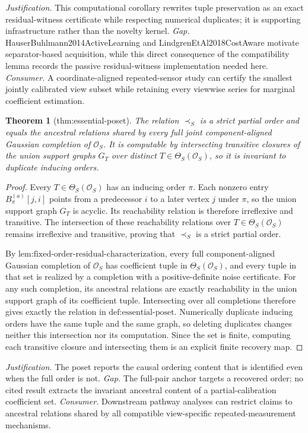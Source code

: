 \documentclass{article}
\newtheorem{theorem}{Theorem}
\begin{document}
\par\smallskip\noindent \textit{Justification.} This computational corollary rewrites tuple preservation as an exact residual-witness certificate while respecting numerical duplicates; it is supporting infrastructure rather than the novelty kernel. \textit{Gap.} HauserBuhlmann2014ActiveLearning and LindgrenEtAl2018CostAware motivate separator-based acquisition, while this direct consequence of the compatibility lemma records the passive residual-witness implementation needed here. \textit{Consumer.} A coordinate-aligned repeated-sensor study can certify the smallest jointly calibrated view subset while retaining every viewwise series for marginal coefficient estimation.

\begin{theorem}[thm:essential-poset]\label{thm:essential-poset}
The relation \(\prec_S\) is a strict partial order and equals the ancestral relations shared by every full joint component-aligned Gaussian completion of \(\mathcal O_S\). It is computable by intersecting transitive closures of the union support graphs \(G_T\) over distinct \(T\in\Theta_S(\mathcal O_S)\), so it is invariant to duplicate inducing orders.
\end{theorem}
\begin{proof}
Every \(T\in\Theta_S(\mathcal O_S)\) has an inducing order \(\pi\).  Each nonzero entry \(B_\pi^{(a)}[j,i]\) points from a predecessor \(i\) to a later vertex \(j\) under \(\pi\), so the union support graph \(G_T\) is acyclic.  Its reachability relation is therefore irreflexive and transitive.  The intersection of these reachability relations over \(T\in\Theta_S(\mathcal O_S)\) remains irreflexive and transitive, proving that \(\prec_S\) is a strict partial order.

By \(\text{lem:fixed-order-residual-characterization}\), every full component-aligned Gaussian completion of \(\mathcal O_S\) has coefficient tuple in \(\Theta_S(\mathcal O_S)\), and every tuple in that set is realized by a completion with a positive-definite noise certificate.  For any such completion, its ancestral relations are exactly reachability in the union support graph of its coefficient tuple.  Intersecting over all completions therefore gives exactly the relation in \(\text{def:essential-poset}\).  Numerically duplicate inducing orders have the same tuple and the same graph, so deleting duplicates changes neither this intersection nor its computation.  Since the set is finite, computing each transitive closure and intersecting them is an explicit finite recovery map.
\end{proof}
\par\smallskip\noindent \textit{Justification.} The poset reports the causal ordering content that is identified even when the full order is not. \textit{Gap.} The full-pair anchor targets a recovered order; no cited result extracts the invariant ancestral content of a partial-calibration coefficient set. \textit{Consumer.} Downstream pathway analyses can restrict claims to ancestral relations shared by all compatible view-specific repeated-measurement mechanisms.
\end{document}
